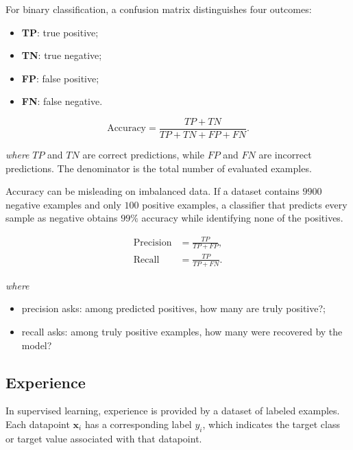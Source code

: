 \documentclass[11pt,a4paper]{report}
\newcommand{\vect}[1]{\bm{#1}}
\newcommand{\wherelegend}{\par\smallskip\textit{where}\vspace{-0.3em}}
\begin{document}
For binary classification, a confusion matrix distinguishes four outcomes:
\begin{itemize}
  \item \textbf{TP}: true positive;
  \item \textbf{TN}: true negative;
  \item \textbf{FP}: false positive;
  \item \textbf{FN}: false negative.
\end{itemize}

\begin{metricbox}[title={Accuracy}]
\begin{equation}
  \mathrm{Accuracy} = \frac{TP+TN}{TP+TN+FP+FN}.
  \label{eq:accuracy}
\end{equation}
\wherelegend
$TP$ and $TN$ are correct predictions, while $FP$ and $FN$ are incorrect predictions. The denominator is the total number of evaluated examples.
\end{metricbox}

Accuracy can be misleading on imbalanced data. If a dataset contains $9900$ negative examples and only $100$ positive examples, a classifier that predicts every sample as negative obtains $99\%$ accuracy while identifying none of the positives.

\begin{metricbox}[title={Precision and Recall}]
\begin{align}
  \mathrm{Precision} &= \frac{TP}{TP+FP}, \label{eq:precision}\\
  \mathrm{Recall} &= \frac{TP}{TP+FN}. \label{eq:recall}
\end{align}
\wherelegend
\begin{itemize}
  \item precision asks: among predicted positives, how many are truly positive?;
  \item recall asks: among truly positive examples, how many were recovered by the model?
\end{itemize}
\end{metricbox}

\subsection{Experience}

In supervised learning, experience is provided by a dataset of labeled examples. Each datapoint $\vect{x}_i$ has a corresponding label $y_i$, which indicates the target class or target value associated with that datapoint.
\end{document}
